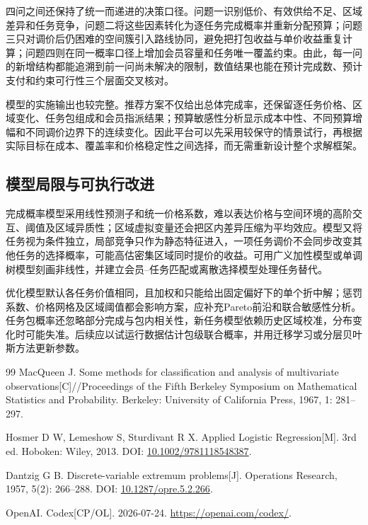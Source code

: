 ﻿\documentclass[UTF8,zihao=-4,a4paper,fontset=fandol]{ctexart}
\begin{document}
四问之间还保持了统一而递进的决策口径。问题一识别低价、有效供给不足、区域差异和任务竞争，问题二将这些因素转化为逐任务完成概率并重新分配预算；问题三只对调价后仍困难的空间簇引入路线协同，避免把打包收益与单价收益重复计算；问题四则在同一概率口径上增加会员容量和任务唯一覆盖约束。由此，每一问的新增结构都能追溯到前一问尚未解决的限制，数值结果也能在预计完成数、预计支付和约束可行性三个层面交叉核对。

模型的实施输出也较完整。推荐方案不仅给出总体完成率，还保留逐任务价格、区域变化、任务包组成和会员指派结果；预算敏感性分析显示成本中性、不同预算增幅和不同调价边界下的连续变化。因此平台可以先采用较保守的情景试行，再根据实际目标在成本、覆盖率和价格稳定性之间选择，而无需重新设计整个求解框架。

\subsection{模型局限与可执行改进}

完成概率模型采用线性预测子和统一价格系数，难以表达价格与空间环境的高阶交互、阈值及区域异质性；区域虚拟变量还会把区内差异压缩为平均效应。模型又将任务视为条件独立，局部竞争只作为静态特征进入，一项任务调价不会同步改变其他任务的选择概率，可能高估密集区域同时提价的收益。可用广义加性模型或单调树模型刻画非线性，并建立会员--任务匹配或离散选择模型处理任务替代。

优化模型默认各任务价值相同，且加权和只能给出固定偏好下的单个折中解；惩罚系数、价格网格及区域阈值都会影响方案，应补充Pareto前沿和联合敏感性分析。任务包概率还忽略部分完成与包内相关性，新任务模型依赖历史区域校准，分布变化时可能失准。后续应以试运行数据估计包级联合概率，并用迁移学习或分层贝叶斯方法更新参数。

\begin{thebibliography}{99}
  MacQueen J. Some methods for classification and analysis of multivariate observations[C]//Proceedings of the Fifth Berkeley Symposium on Mathematical Statistics and Probability. Berkeley: University of California Press, 1967, 1: 281--297.

  Hosmer D W, Lemeshow S, Sturdivant R X. Applied Logistic Regression[M]. 3rd ed. Hoboken: Wiley, 2013. DOI: \url{10.1002/9781118548387}.

  Dantzig G B. Discrete-variable extremum problems[J]. Operations Research, 1957, 5(2): 266--288. DOI: \url{10.1287/opre.5.2.266}.

  OpenAI. Codex[CP/OL]. 2026-07-24. \url{https://openai.com/codex/}.
\end{thebibliography}
\end{document}
